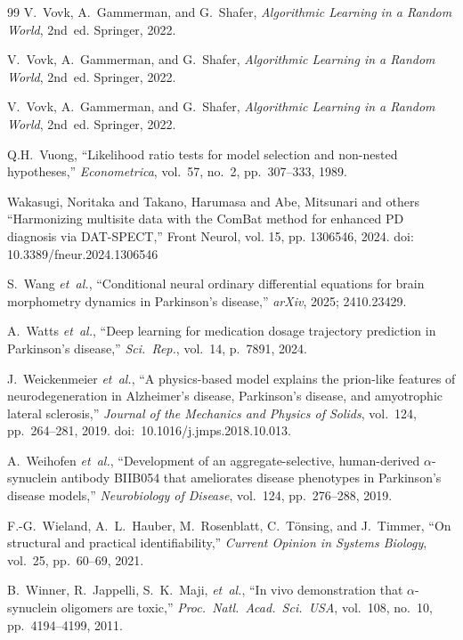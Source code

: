\begin{thebibliography}{99}
V.~Vovk, A.~Gammerman, and G.~Shafer, \textit{Algorithmic Learning in a Random World}, 2nd~ed. Springer, 2022.

V.~Vovk, A.~Gammerman, and G.~Shafer, \textit{Algorithmic Learning in a Random World}, 2nd~ed. Springer, 2022.

V.~Vovk, A.~Gammerman, and G.~Shafer, \textit{Algorithmic Learning in a Random World}, 2nd~ed. Springer, 2022.


Q.H.~Vuong, ``Likelihood ratio tests for model selection and non-nested
hypotheses,'' \textit{Econometrica}, vol.~57, no.~2, pp.~307--333,
1989.

 Wakasugi, Noritaka and Takano, Harumasa and Abe, Mitsunari and others ``Harmonizing multisite data with the ComBat method for enhanced PD diagnosis via DAT-SPECT,'' Front Neurol, vol. 15, pp. 1306546, 2024. doi: 10.3389/fneur.2024.1306546

S.~Wang \textit{et~al.}, ``Conditional neural ordinary differential equations for brain morphometry dynamics in Parkinson's disease,'' \textit{arXiv}, 2025; 2410.23429.

A.~Watts \textit{et~al.}, ``Deep learning for medication dosage trajectory prediction in Parkinson's disease,'' \textit{Sci.\ Rep.}, vol.~14, p.~7891, 2024.

J.~Weickenmeier \textit{et~al.}, ``A physics-based model explains the prion-like features of neurodegeneration in Alzheimer's disease, Parkinson's disease, and amyotrophic lateral sclerosis,'' \textit{Journal of the Mechanics and Physics of Solids}, vol.~124, pp.~264--281, 2019. doi:~10.1016/j.jmps.2018.10.013.

A.~Weihofen \textit{et~al.}, ``Development of an aggregate-selective, human-derived $\alpha$-synuclein antibody BIIB054 that ameliorates disease phenotypes in Parkinson's disease models,'' \textit{Neurobiology of Disease}, vol.~124, pp.~276--288, 2019.

F.-G.~Wieland, A.~L.~Hauber, M.~Rosenblatt, C.~T\"onsing, and J.~Timmer, ``On structural and practical identifiability,'' \textit{Current Opinion in Systems Biology}, vol.~25, pp.~60--69, 2021.

B.~Winner, R.~Jappelli, S.~K.~Maji, \textit{et~al.}, ``In vivo demonstration that $\alpha$-synuclein oligomers are toxic,'' \textit{Proc.\ Natl.\ Acad.\ Sci.\ USA}, vol.~108, no.~10, pp.~4194--4199, 2011.


\end{thebibliography}
